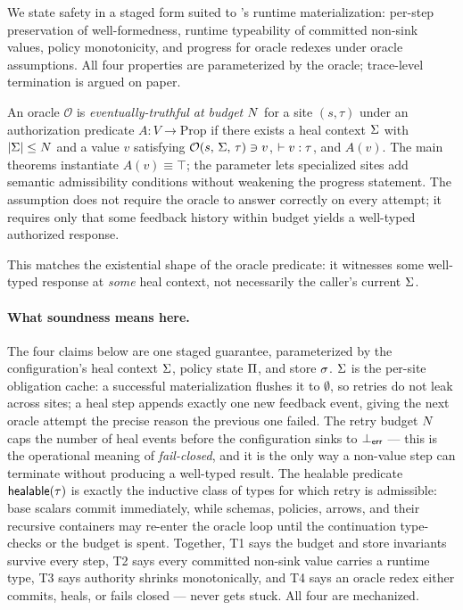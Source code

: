 We state safety in a staged form suited to \pact's runtime
materialization: per-step preservation of well-formedness, runtime
typeability of committed non-sink values, policy monotonicity, and
progress for oracle redexes under oracle assumptions. All four
properties are parameterized by the oracle; trace-level termination is
argued on paper.

\begin{definition}
\label{def:oracle-truthful}
An oracle $\mathcal{O}$ is \emph{eventually-truthful at budget $N$}
for a site $(s,\tau)$ under an authorization predicate
$A : V \to \mathrm{Prop}$ if there exists a heal context $\Sigma$ with
$|\Sigma| \le N$ and a value $v$ satisfying
$\mathcal{O}(s,\,\Sigma,\,\tau) \ni v$, $\vdash v : \tau$, and $A(v)$. The
main theorems instantiate $A(v) \equiv \top$; the parameter lets
specialized sites add semantic admissibility conditions without
weakening the progress statement. The assumption does not require the
oracle to answer correctly on every attempt; it requires only that some
feedback history within budget yields a well-typed authorized response.
\end{definition}

\begin{sloppypar}
This matches the existential shape of the oracle predicate: it witnesses some well-typed
response at \emph{some} heal context, not necessarily the caller's
current $\Sigma$.
\end{sloppypar}

\paragraph{What soundness means here.} The four claims below are one
staged guarantee, parameterized by the configuration's heal context
$\Sigma$, policy state $\Pi$, and store $\sigma$. $\Sigma$ is the
per-site obligation cache: a successful materialization flushes it to
$\emptyset$, so retries do not leak across sites; a heal step appends
exactly one new feedback event, giving the next oracle attempt the
precise reason the previous one failed. The retry budget $N$ caps
the number of heal events before the configuration sinks to $\bot_{\mathsf{err}}$ ---
this is the operational meaning of \emph{fail-closed}, and it is the
only way a non-value step can terminate without producing a well-typed
result. The healable predicate $\mathsf{healable}(\tau)$ is exactly the
inductive class of types for which retry is admissible: base scalars
commit immediately, while schemas, policies, arrows, and their
recursive containers may re-enter the oracle loop until the
continuation type-checks or the budget is spent. Together, T1 says the
budget and store invariants survive every step, T2 says every committed
non-sink value carries a runtime type, T3 says authority shrinks
monotonically, and T4 says an oracle redex either commits, heals, or
fails closed --- never gets stuck. All four are mechanized.

